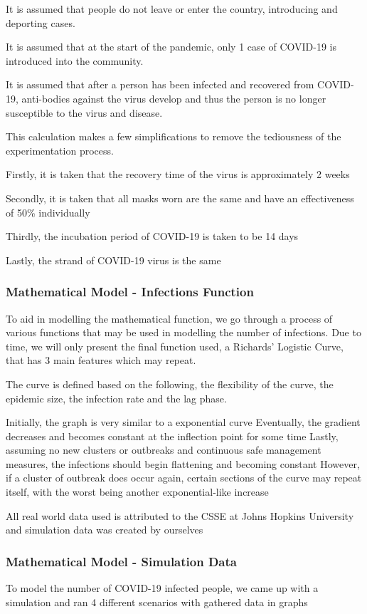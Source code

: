 \documentclass[a4paper,titlepage]{article}
\begin{document}
It is assumed that people do not leave or enter the country, introducing and deporting cases.

It is assumed that at the start of the pandemic, only 1 case of COVID-19 is introduced into the community.

It is assumed that after a person has been infected and recovered from COVID-19, anti-bodies against the virus develop and thus the person is no longer susceptible to the virus and disease.

This calculation makes a few simplifications to remove the tediousness of the experimentation process.

Firstly, it is taken that the recovery time of the virus is approximately 2 weeks

Secondly, it is taken that all masks worn are the same and have an effectiveness of 50\% individually

Thirdly, the incubation period of COVID-19 is taken to be 14 days

Lastly, the strand of COVID-19 virus is the same

\subsubsection{Mathematical Model - Infections Function}

To aid in modelling the mathematical function, we go through a process of various functions that may be used in modelling the number of infections. Due to time, we will only present the final function used, a Richards’ Logistic Curve, that has 3 main features which may repeat.

The curve is defined based on the following, the flexibility of the curve, the epidemic size, the infection rate and the lag phase.

Initially, the graph is very similar to a exponential curve
Eventually, the gradient decreases and becomes constant at the inflection point for some time
Lastly, assuming no new clusters or outbreaks and continuous safe management measures, the infections should begin flattening and becoming constant
However, if a cluster of outbreak does occur again, certain sections of the curve may repeat itself, with the worst being another exponential-like increase

All real world data used is attributed to the CSSE at Johns Hopkins University and simulation data was created by ourselves

\subsubsection{Mathematical Model - Simulation Data}
To model the number of COVID-19 infected people, we came up with a simulation and ran 4 different scenarios with gathered data in graphs
\end{document}
